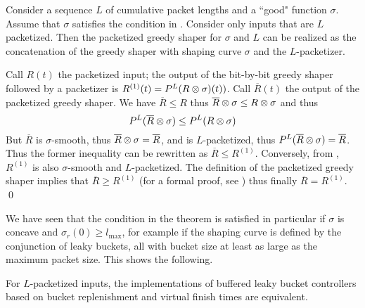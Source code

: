 \begin{theorem}
Consider a sequence $L$ of cumulative packet lengths and a ``good"
function $\sigma$. Assume that $\sigma$ satisfies the condition in
. Consider only inputs that are $L$ packetized.
Then the packetized greedy shaper for $\sigma$ and $L$ can be
realized as the concatenation of the greedy shaper with shaping
curve $\sigma$ and the $L$-packetizer.
\end{theorem}
\begin{figure}[htbp]
\end{figure}

\pr
Call $R(t)$ the packetized input; the output of the bit-by-bit
greedy shaper followed by a packetizer is $R^{(1)}(t)=P^L(R \otimes
\sigma)(t))$. Call $\overline{R}(t)$ the output of the packetized
greedy shaper. We have $\overline{R} \leq R$ thus
$\overline{R}\otimes \sigma \leq R\otimes \sigma$ and thus
$$P^L(\overline{R}\otimes \sigma) \leq P^L(R\otimes \sigma)$$
But $\overline{R}$ is $\sigma$-smooth, thus $\overline{R}\otimes
\sigma = \overline{R}$, and is $L$-packetized, thus
$P^L(\overline{R}\otimes \sigma)=\overline{R}$. Thus the former
inequality can be rewritten as
 $\overline{R} \leq R^{(1)}$.
 Conversely, from , $R^{(1)}$ is also
 $\sigma$-smooth and
 $L$-packetized. The definition of the packetized greedy shaper
 implies that $\overline{R} \geq R^{(1)}$ (for a formal proof, see
 ) thus finally $\overline{R} = R^{(1)}$.
\qed

We have seen  that the condition in the theorem is satisfied in
particular if
 $\sigma$ is concave and $\sigma_r(0) \geq l_{\max}$, for
 example if the shaping curve is defined by the conjunction of
 leaky buckets, all with bucket size at least as large as the
 maximum packet size. This shows the following.
\begin{corollary}
 For $L$-packetized inputs, the implementations of buffered leaky
 bucket controllers based on bucket replenishment and virtual finish
 times are equivalent.
 \end{corollary}


